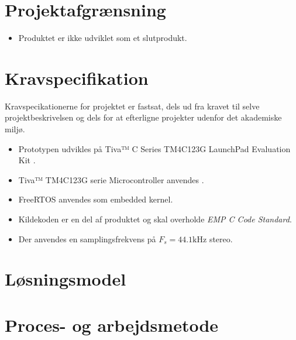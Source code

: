 \section{Projektafgrænsning}
\begin{itemize}
	\item Produktet er ikke udviklet som et slutprodukt.
\end{itemize}

\section{Kravspecifikation} 
Kravspecikationerne for projektet er fastsat, dels ud fra kravet til selve projektbeskrivelsen og dels for at efterligne projekter udenfor det akademiske miljø.

\begin{itemize}[noitemsep]
	\item Prototypen udvikles på Tiva™ C Series TM4C123G LaunchPad Evaluation Kit \cite{spmt281a}.
	\item Tiva™ TM4C123G serie Microcontroller anvendes \cite{spmu296}.
	\item FreeRTOS anvendes som embedded kernel.
	\item Kildekoden er en del af produktet og skal overholde \textit{EMP C Code Standard}\cite{emp-c}.
	\item Der anvendes en samplingsfrekvens på $F_s = 44.1 \si{\kilo\hertz}$ stereo.
\end{itemize}


\section{Løsningsmodel}

\section{Proces- og arbejdsmetode}
